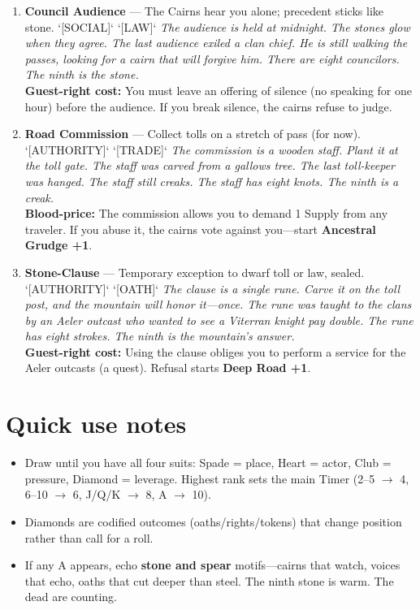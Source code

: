 \begin{enumerate}
\item[Q] \textbf{Council Audience} --- The Cairns hear you alone; precedent sticks like stone. `[SOCIAL]` `[LAW]`
  \hfill \textit{The audience is held at midnight. The stones glow when they agree. The last audience exiled a clan chief. He is still walking the passes, looking for a cairn that will forgive him. There are eight councilors. The ninth is the stone.} \\
  \textbf{Guest-right cost:} You must leave an offering of silence (no speaking for one hour) before the audience. If you break silence, the cairns refuse to judge.

\item[K] \textbf{Road Commission} --- Collect tolls on a stretch of pass (for now). `[AUTHORITY]` `[TRADE]`
  \hfill \textit{The commission is a wooden staff. Plant it at the toll gate. The staff was carved from a gallows tree. The last toll-keeper was hanged. The staff still creaks. The staff has eight knots. The ninth is a creak.} \\
  \textbf{Blood-price:} The commission allows you to demand 1 Supply from any traveler. If you abuse it, the cairns vote against you---start \textbf{Ancestral Grudge +1}.

\item[A] \textbf{Stone-Clause} --- Temporary exception to dwarf toll or law, sealed. `[AUTHORITY]` `[OATH]`
  \hfill \textit{The clause is a single rune. Carve it on the toll post, and the mountain will honor it---once. The rune was taught to the clans by an Aeler outcast who wanted to see a Viterran knight pay double. The rune has eight strokes. The ninth is the mountain's answer.} \\
  \textbf{Guest-right cost:} Using the clause obliges you to perform a service for the Aeler outcasts (a quest). Refusal starts \textbf{Deep Road +1}.
\end{enumerate}

\section{Quick use notes}
\label{sec:ubral-quick-use}
\begin{itemize}
\item Draw until you have all four suits: Spade = place, Heart = actor, Club = pressure, Diamond = leverage. Highest rank sets the main Timer (2--5 \(\rightarrow\) 4, 6--10 \(\rightarrow\) 6, J/Q/K \(\rightarrow\) 8, A \(\rightarrow\) 10).
\item Diamonds are codified outcomes (oaths/rights/tokens) that change position rather than call for a roll.
\item If any A appears, echo \textbf{stone and spear} motifs---cairns that watch, voices that echo, oaths that cut deeper than steel. The ninth stone is warm. The dead are counting.
\end{itemize}

